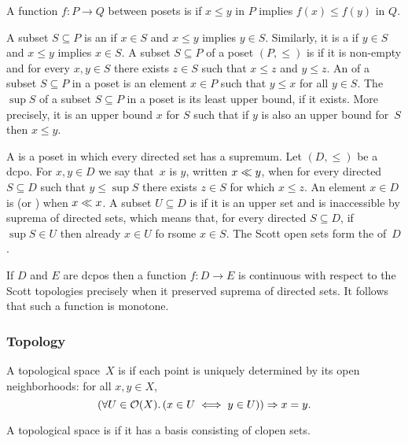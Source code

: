A function $f : P \to Q$ between posets is  if $x \leq
y$ in $P$ implies $f(x) \leq f(y)$ in $Q$.

A subset $S \subseteq P$ is an  if $x \in S$ and $x
\leq y$ implies $y \in S$. Similarly, it is a  if $y
\in S$ and $x \leq y$ implies $x \in S$.
%
A subset $S \subseteq P$ of a poset $(P, {\leq})$ is 
if it is non-empty and for every $x, y \in S$ there exists $z \in S$
such that $x \leq z$ and $y \leq z$.
%
An  of a subset $S \subseteq P$ in a poset is an
element $x \in P$ such that $y \leq x$ for all $y \in S$.
%
The  $\sup S$ of a subset $S \subseteq P$ in a poset is
its least upper bound, if it exists. More precisely, it is an upper
bound $x$ for $S$ such that if $y$ is also an upper bound for~$S$ then
$x \leq y$.

A  is a poset in which
every directed set has a supremum. Let $(D, {\leq})$ be a dcpo. For
$x, y \in D$ we say that~$x$ is  $y$, written $x \ll
y$, when for every directed $S \subseteq D$ such that $y \leq \sup S$
there exists $z \in S$ for which $x \leq z$. An element $x \in D$ is
 (or ) when $x \ll x$. A subset $U
\subseteq D$ is  if it is an upper set and is
inaccessible by suprema of directed sets, which means that, for every
directed $S \subseteq D$, if $\sup S \in U$ then already $x \in U$ fo
rsome $x \in S$. The Scott open sets form the 
of~$D$.

If $D$ and $E$ are dcpos then a function $f : D \to E$ is continuous
with respect to the Scott topologies precisely when it preserved
suprema of directed sets. It follows that such a function is monotone.


\subsubsection*{Topology}

A topological space~$X$ is  if each point is
uniquely determined by its open neighborhoods: for all $x, y \in
X$,
%
\begin{equation*}
  (\forall U \in \mathcal{O}(X) .\, (x \in U \iff y \in U)) \Rightarrow x = y.
\end{equation*}

A topological space is  if it has a basis
consisting of clopen sets.






